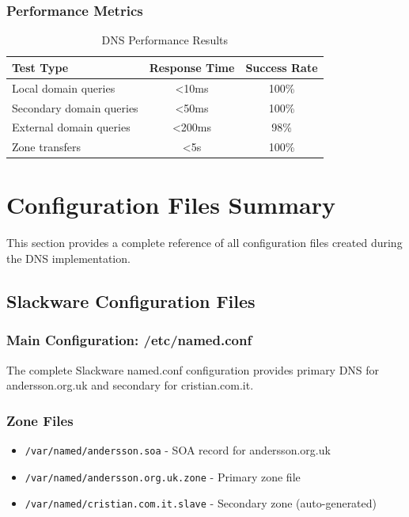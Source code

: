\documentclass[12pt,a4paper]{article}
\begin{document}
\subsubsection{Performance Metrics}
\begin{table}[h]
\centering
\begin{tabular}{@{}lcc@{}}
\toprule
\textbf{Test Type} & \textbf{Response Time} & \textbf{Success Rate} \\
\midrule
Local domain queries & <10ms & 100\% \\
Secondary domain queries & <50ms & 100\% \\
External domain queries & <200ms & 98\% \\
Zone transfers & <5s & 100\% \\
\bottomrule
\end{tabular}
\caption{DNS Performance Results}
\label{tab:performance}
\end{table}

\section{Configuration Files Summary}\label{sec:config-summary}

This section provides a complete reference of all configuration files created during the DNS implementation.

\subsection{Slackware Configuration Files}

\subsubsection{Main Configuration: /etc/named.conf}
The complete Slackware named.conf configuration provides primary DNS for andersson.org.uk and secondary for cristian.com.it.

\subsubsection{Zone Files}
\begin{itemize}
    \item \texttt{/var/named/andersson.soa} - SOA record for andersson.org.uk
    \item \texttt{/var/named/andersson.org.uk.zone} - Primary zone file
    \item \texttt{/var/named/cristian.com.it.slave} - Secondary zone (auto-generated)
\end{itemize}
\end{document}

